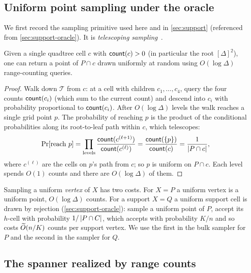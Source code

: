 \subsection{Uniform point sampling under the oracle}\label{sec:prelim-sample}

We first record the sampling primitive used here and in \cref{sec:support} (referenced from
\cref{sec:support-oracle}). It is \emph{telescoping sampling}~\cite{Monemizadeh23}.

\begin{lemma}\label{lem:telescoping}
Given a single quadtree cell $c$ with $\mathsf{count}(c)>0$ (in particular the root $[\Delta]^2$), one can return a
point of $P\cap c$ drawn uniformly at random using $O(\log\Delta)$ range-counting queries.
\end{lemma}

\begin{proof}
Walk down $\mathcal T$ from $c$: at a cell with children $c_1,\dots,c_4$, query the four counts
$\mathsf{count}(c_i)$ (which sum to the current count) and descend into $c_i$ with probability proportional to
$\mathsf{count}(c_i)$. After $O(\log\Delta)$ levels the walk reaches a single grid point $p$. The probability of
reaching $p$ is the product of the conditional probabilities along its root-to-leaf path within $c$, which
telescopes:
\[
  \Pr[\text{reach }p]=\prod_{\text{levels}}\frac{\mathsf{count}(c^{(\ell+1)})}{\mathsf{count}(c^{(\ell)})}
   =\frac{\mathsf{count}(\{p\})}{\mathsf{count}(c)}=\frac1{\left|P\cap c\right|},
\]
where $c^{(\ell)}$ are the cells on $p$'s path from $c$; so $p$ is uniform on $P\cap c$. Each level spends
$O(1)$ counts and there are $O(\log\Delta)$ of them.
\end{proof}

Sampling a uniform \emph{vertex} of $X$ has two costs. For $X=P$ a uniform vertex is a uniform point,
$O(\log\Delta)$ counts. For a support $X=Q$ a uniform support cell is drawn by rejection
(\cref{sec:support-oracle}): sample a uniform point of $P$, accept its $h$-cell with probability
$1/\left|P\cap C\right|$, which accepts with probability $K/n$ and so costs $\widetilde{O}(n/K)$ counts per support
vertex. We use the first in the bulk sampler for $P$ and the second in the sampler for $Q$.

\subsection{The spanner realized by range counts}\label{sec:wspd-spanner}

